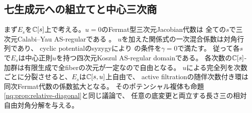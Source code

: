 \subsection{七生成元への組立てと中心三次商}
まず$E_s$を$\mathbb C[s]$上で考える。$u=0$のFermat型三次元Jacobian代数は
全ての$s$で三次元Calabi--Yau AS-regularである
\cite[Theorem 4.2(1)]{MSNE12}。
$u$を加えた関係式の一次混合係数は対角行列であり、
cyclic potentialのsyzygyにより
\cite[Theorem 3.1.3]{LBSVNE12}の条件を$\gamma=0$で満たす。
従って各$s$で$E_s$は中心正則$u$を持つ四次元Koszul AS-regular domainである。
各次数の$\mathbb C[s]$-加群は有限生成で全fiberの次元が一定なので自由となる。
$u$による完全列を次数ごとに分裂させると、$E_s$は$\mathbb C[s,u]$上自由で、
active filtrationの随伴次数付き環は同次Fermat代数の係数拡大となる。
そのポテンシャル複体も命題\ref{nq:prop:relative-diagonal}と同じ議論で、
任意の底変更と両立する長さ三の相対自由対角分解を与える。

